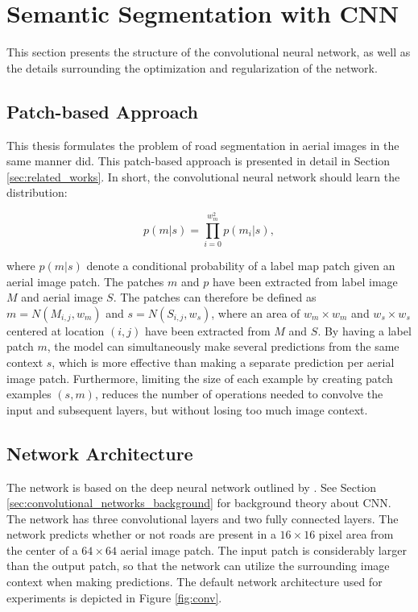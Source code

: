 \section{Semantic Segmentation with CNN}
\label{sec:network}
This section presents the structure of the convolutional neural network, as well as the details surrounding the optimization and regularization of the network. 

\subsection{Patch-based Approach}
This thesis formulates the problem of road segmentation in aerial images in the same manner  \cite{Mnih_roads_high_res_aerial_images} did. This patch-based approach is presented in detail in Section \ref{sec:related_works}. In short, the convolutional neural network should learn the distribution:

$$ p(m|s) = \prod_{i=0}^{w_m^2}p(m_i | s),  $$

\noindent where $p(m|s)$ denote a conditional probability of a label map patch given an aerial image patch. The patches $m$ and $p$ have been extracted from label image $M$ and aerial image $S$. The patches can therefore be defined as $m =N(M_{i,j}, w_m)$ and $ s = N(S_{i,j}, w_s)$, where an area of $w_m \times w_m$ and $w_s \times w_s$ centered at location $(i, j)$ have been extracted from $M$ and $S$. By having a label patch $m$, the model can simultaneously make several predictions from the same context $s$, which is more effective than making a separate prediction per aerial image patch. Furthermore, limiting the size of each example by creating patch examples $(s, m)$, reduces the number of operations needed to convolve the input and subsequent layers, but without losing too much image context.  \\ 


\subsection{Network Architecture}
The network is based on the deep neural network outlined by \cite{MnihThesis}. See Section \ref{sec:convolutional_networks_background} for background theory about \ac{CNN}. The network has three convolutional layers and two fully connected layers. The network predicts whether or not roads are present in a $16 \times 16$ pixel area from the center of  a $64 \times 64$ aerial image patch. The input patch is considerably larger than the output patch, so that the network can utilize the surrounding image context when making predictions. The default network architecture used for experiments is depicted in Figure \ref{fig:conv}. \\

